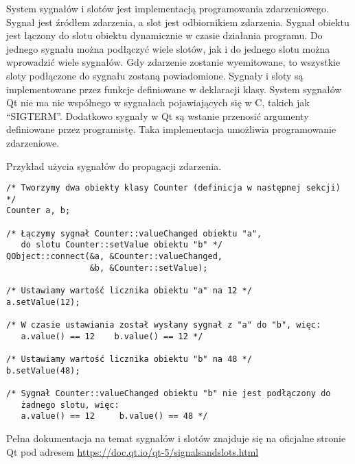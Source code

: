 
\par
System sygnałów i slotów jest implementacją programowania zdarzeniowego.
Sygnał jest źródłem zdarzenia, a slot jest odbiornikiem zdarzenia.
Sygnał obiektu jest łączony do slotu obiektu dynamicznie w czasie działania programu.
Do jednego sygnału można podłączyć wiele slotów, jak i do jednego slotu można wprowadzić wiele sygnałów.
Gdy zdarzenie zostanie wyemitowane, to wszystkie sloty podłączone do sygnału zostaną powiadomione.
Sygnały i sloty są implementowane przez funkcje definiowane w deklaracji klasy.
System sygnałów Qt nie ma nic wspólnego w sygnałach pojawiających się w C, takich jak \enquote{SIGTERM}.
Dodatkowo sygnały w Qt są wstanie przenosić argumenty definiowane przez programistę.
Taka implementacja umożliwia programowanie zdarzeniowe.

\par
Przykład użycia sygnałów do propagacji zdarzenia.

\begin{lstlisting}
/* Tworzymy dwa obiekty klasy Counter (definicja w następnej sekcji) */
Counter a, b;

/* Łączymy sygnał Counter::valueChanged obiektu "a",
   do slotu Counter::setValue obiektu "b" */
QObject::connect(&a, &Counter::valueChanged,
                 &b, &Counter::setValue);

/* Ustawiamy wartość licznika obiektu "a" na 12 */
a.setValue(12);

/* W czasie ustawiania został wysłany sygnał z "a" do "b", więc:
   a.value() == 12    b.value() == 12 */

/* Ustawiamy wartość licznika obiektu "b" na 48 */
b.setValue(48);

/* Sygnał Counter::valueChanged obiektu "b" nie jest podłączony do
   żadnego slotu, więc:
   a.value() == 12     b.value() == 48 */

\end{lstlisting}

\par
Pełna dokumentacja na temat sygnałów i slotów znajduje się na oficjalne stronie Qt pod adresem \url{https://doc.qt.io/qt-5/signalsandslots.html}